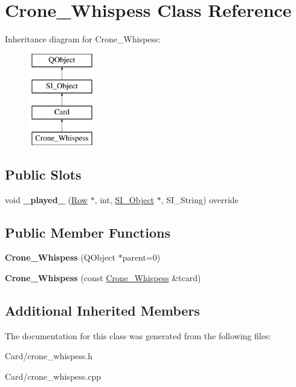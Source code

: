 \hypertarget{class_crone___whispess}{}\section{Crone\+\_\+\+Whispess Class Reference}
\label{class_crone___whispess}
Inheritance diagram for Crone\+\_\+\+Whispess\+:\begin{figure}[H]
\begin{center}
\leavevmode
\includegraphics[height=4.000000cm]{class_crone___whispess}
\end{center}
\end{figure}
\subsection*{Public Slots}
\begin{DoxyCompactItemize}
\item 
\mbox{\label{class_crone___whispess_a321a856d9922b55f951020ecd80439fd}} 
void {\bfseries \+\_\+played\+\_\+} (\hyperlink{class_card_set}{Row} $\ast$, int, \hyperlink{class_s_i___object}{S\+I\+\_\+\+Object} $\ast$, S\+I\+\_\+\+String) override
\end{DoxyCompactItemize}
\subsection*{Public Member Functions}
\begin{DoxyCompactItemize}
\item 
\mbox{\label{class_crone___whispess_a5753c71028ba1fe9c6478d83fc43d8a4}} 
{\bfseries Crone\+\_\+\+Whispess} (Q\+Object $\ast$parent=0)
\item 
\mbox{\label{class_crone___whispess_aa80de6ec07df32abbad010bf79460962}} 
{\bfseries Crone\+\_\+\+Whispess} (const \hyperlink{class_crone___whispess}{Crone\+\_\+\+Whispess} \&tcard)
\end{DoxyCompactItemize}
\subsection*{Additional Inherited Members}


The documentation for this class was generated from the following files\+:\begin{DoxyCompactItemize}
\item 
Card/crone\+\_\+whispess.\+h\item 
Card/crone\+\_\+whispess.\+cpp\end{DoxyCompactItemize}
